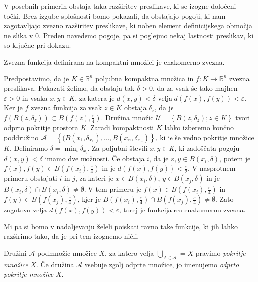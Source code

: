 \documentclass[mat1]{fmfdelo}
\newcommand{\R}{\mathbb R}
\newcommand{\0}{\underline{0}}
\newcommand{\pA}{\mathcal A}
\newcommand{\pU}{\mathcal U}
\begin{document}
V posebnih primerih obstaja taka razširitev preslikave, ki se izogne določeni točki. Brez izgube splošnosti bomo pokazali, da obstajajo pogoji, ki nam zagotavljajo zvezno razširitev preslikave, ki noben element definicijskega območja ne slika v $\0$. Preden navedemo pogoje, pa si poglejmo nekaj lastnosti preslikav, ki so ključne pri dokazu.

\begin{trditev}
Zvezna funkcija definirana na kompaktni množici je enakomerno zvezna.
\end{trditev}
\begin{dokaz}
Predpostavimo, da je $K \in \R^n$ poljubna kompaktna množica in $f : K \to \R^n$ zvezna preslikava. Pokazati želimo, da obstaja tak $\delta > 0$, da za vsak še tako majhen $\varepsilon > 0$ in vsaka $x, y \in K$, za katera je $d(x, y) < \delta$ velja $d(f(x), f(y)) < \varepsilon$. Ker je $f$ zvezna funkcija za vsak $z \in K$ obstaja $\delta_z$, da je $f(B(z, \delta_z)) \subset B(f(z), \frac{\varepsilon}{4})$. Družina množic $\pU = \left \{ B(z, \delta_z); z \in K \right \}$ tvori odprto pokritje prostora $K$. Zaradi kompaktnosti $K$ lahko izberemo končno poddružino $\pA =  \left \{ (B(x_1, \delta_{x_1}), \dots, B(x_n, \delta_{x_n}) \right \}$, ki je še vedno pokritje množice $K$. Definiramo $\delta = \min_i \delta_{x_i}$. Za poljubni števili $x, y \in K$, ki zadoščata pogoju $d(x, y) < \delta$ imamo dve možnosti. Če obstaja $i$, da je $x, y \in B(x_i, \delta)$, potem je $f(x), f(y) \in B(f(x_i), \frac{\varepsilon}{4})$ in je $d(f(x), f(y)) < \frac{\varepsilon}{2}$. V nasprotnem primeru obstajati $i$ in $j$, za kateri je $x \in B(x_i, \delta)$, $y \in B(x_j, \delta)$ in je $B(x_i, \delta) \cap B(x_i, \delta) \neq \emptyset$. V tem primeru je $f(x) \in B(f(x_i), \frac{\varepsilon}{4})$ in $f(y) \in B(f(x_j), \frac{\varepsilon}{4})$, kjer je $B(f(x_i), \frac{\varepsilon}{4}) \cap B(f(x_j), \frac{\varepsilon}{4}) \neq \emptyset$. Zato zagotovo velja $d(f(x), f(y)) < \varepsilon$, torej je funkcija res enakomerno zvezna.
\end{dokaz}

Mi pa si bomo v nadaljevanju želeli poiskati ravno take funkcije, ki jih lahko razširimo tako, da je pri tem izognemo ničli. 
\begin{definicija}
Družini $\mathcal{A}$ podmnožic množice $X$, za katero velja $\bigcup_{A \in \mathcal{A}} = X$ pravimo \emph{pokritje množice} $X$. Če družina $\mathcal{A}$ vsebuje zgolj odprte množice, jo imenujemo \emph{odprto pokritje množice} $X$.
\end{definicija}
\end{document}
